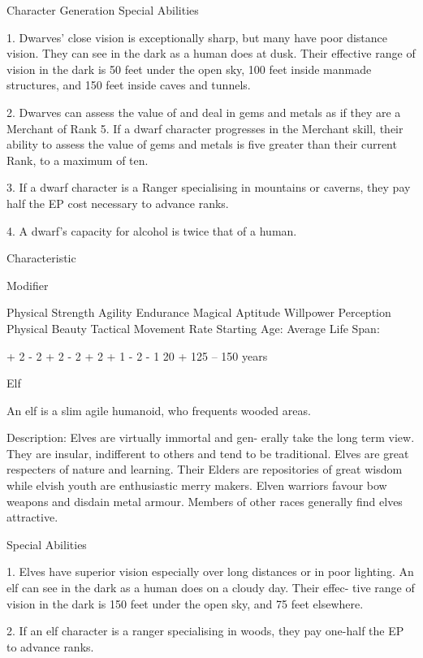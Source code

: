 \begin{Chapter}{Character Generation}
Special Abilities 

1. Dwarves’ close vision is exceptionally sharp, but 
many  have  poor  distance  vision.  They  can  see  in 
the  dark  as  a  human  does  at  dusk.  Their  effective 
range of vision in the dark is 50 feet under the open 
sky,  100  feet  inside  manmade  structures,  and  150 
feet inside caves and tunnels. 

2.  Dwarves  can  assess  the  value  of  and  deal  in 
gems and metals as if they are a Merchant of Rank 
5.  If  a  dwarf  character  progresses  in  the  Merchant 
skill,  their  ability  to  assess  the  value  of  gems  and 
metals  is  five  greater  than their  current Rank,  to a 
maximum of ten. 

3.  If  a  dwarf  character  is  a  Ranger  specialising  in 
mountains  or  caverns,  they  pay  half  the  EP  cost 
necessary to advance ranks. 

4. A dwarf’s capacity for alcohol is twice that of a 
human. 

Characteristic 

Modifier 

Physical Strength 
Agility 
Endurance 
Magical Aptitude 
Willpower 
Perception 
Physical Beauty 
Tactical Movement Rate 
Starting Age: 
Average Life Span: 

+ 2 
- 2 
+ 2 
- 2 
+ 2 
+ 1 
- 2 
- 1 
20 +  
125 – 150 years 

Elf 

An  elf  is  a  slim  agile  humanoid,  who  frequents 
wooded areas. 

Description: Elves are virtually immortal and gen-
erally  take  the  long  term  view.  They  are  insular, 
indifferent  to  others  and  tend  to  be  traditional. 
Elves  are  great  respecters  of  nature  and  learning. 
Their Elders are repositories of great wisdom while 
elvish  youth  are  enthusiastic  merry  makers.  Elven 
warriors  favour  bow  weapons  and  disdain  metal 
armour.  Members  of  other  races  generally  find 
elves attractive. 

Special Abilities 

1.  Elves  have  superior  vision  especially  over  long 
distances or in poor lighting. An elf can see in the 
dark as a human does on a cloudy day. Their effec-
tive  range  of  vision  in  the  dark  is  150  feet  under 
the open sky, and 75 feet elsewhere. 

2.  If  an  elf  character  is  a  ranger  specialising  in 
woods, they pay one-half the EP to advance ranks. 


\end{Chapter}
